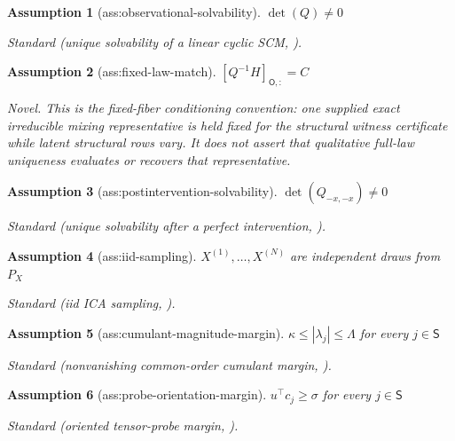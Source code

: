 \documentclass{article}
\newtheorem{assumption}{Assumption}
\begin{document}
\begin{assumption}[ass:observational-solvability]\label{ass:observational-solvability}
\(\det(Q)\ne0\)
\par\smallskip\noindent\emph{Standard} (unique solvability of a linear cyclic SCM, \cite{BongersForrePetersMooij2021}).
\end{assumption}

\begin{assumption}[ass:fixed-law-match]\label{ass:fixed-law-match}
\([Q^{-1}H]_{\mathsf O,:}=C\)
\par\smallskip\noindent\emph{Novel.} This is the fixed-fiber conditioning convention: one supplied exact irreducible mixing representative is held fixed for the structural witness certificate while latent structural rows vary. It does not assert that qualitative full-law uniqueness evaluates or recovers that representative.
\end{assumption}

\begin{assumption}[ass:postintervention-solvability]\label{ass:postintervention-solvability}
\(\det(Q_{-x,-x})\ne0\)
\par\smallskip\noindent\emph{Standard} (unique solvability after a perfect intervention, \cite{BongersForrePetersMooij2021}).
\end{assumption}

\begin{assumption}[ass:iid-sampling]\label{ass:iid-sampling}
\(X^{(1)},\ldots,X^{(N)}\) are independent draws from \(P_X\)
\par\smallskip\noindent\emph{Standard} (iid ICA sampling, \cite{ChenBickel2006}).
\end{assumption}

\begin{assumption}[ass:cumulant-magnitude-margin]\label{ass:cumulant-magnitude-margin}
\(\kappa\le |\lambda_j|\le\Lambda\) for every \(j\in\mathsf S\)
\par\smallskip\noindent\emph{Standard} (nonvanishing common-order cumulant margin, \cite{AnandkumarGeJanzamin2015}).
\end{assumption}

\begin{assumption}[ass:probe-orientation-margin]\label{ass:probe-orientation-margin}
\(u^\top c_j\ge\sigma\) for every \(j\in\mathsf S\)
\par\smallskip\noindent\emph{Standard} (oriented tensor-probe margin, \cite{AnandkumarGeJanzamin2015}).
\end{assumption}
\end{document}
